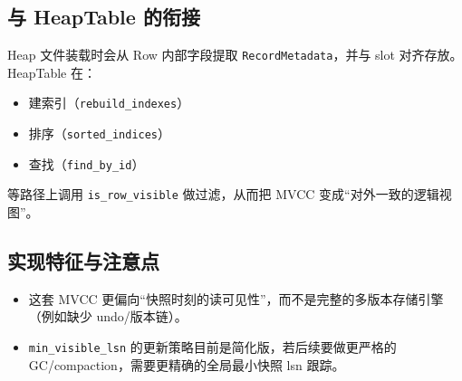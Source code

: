 \subsection{与 HeapTable 的衔接}

Heap 文件装载时会从 Row 内部字段提取 \texttt{RecordMetadata}，并与 slot 对齐存放。
HeapTable 在：

\begin{itemize}
  \item 建索引（\texttt{rebuild\_indexes}）
  \item 排序（\texttt{sorted\_indices}）
  \item 查找（\texttt{find\_by\_id}）
\end{itemize}

等路径上调用 \texttt{is\_row\_visible} 做过滤，从而把 MVCC 变成“对外一致的逻辑视图”。

\subsection{实现特征与注意点}

\begin{itemize}
  \item 这套 MVCC 更偏向“快照时刻的读可见性”，而不是完整的多版本存储引擎（例如缺少 undo/版本链）。
  \item \texttt{min\_visible\_lsn} 的更新策略目前是简化版，若后续要做更严格的 GC/compaction，需要更精确的全局最小快照 lsn 跟踪。
\end{itemize}

